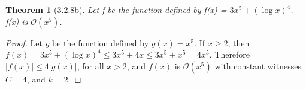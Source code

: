 \documentclass[a4paper, 12pt]{article}
\theoremstyle{plain}
\newtheorem*{theorem*}{Theorem}
\begin{document}
	
	\begin{theorem*}[3.2.8b]
		Let f be the function defined by f(x) = $3x^{5} + (\log x)^{4}$. \newline f(x) is $\mathcal{O}(x^{5})$.
	\end{theorem*}
	
	\begin{proof}
		Let $g$ be the function defined by $g(x) = x^{5}$. If $x \ge 2$, then
		\newline \newline \indent \indent
		$f(x) = 3x^{5} + (\log x)^{4} \le 3x^{5} + 4x \le 3x^{5} + x^{5} = 4x^{5}$. \newline \newline Therefore $|f(x)| \le 4|g(x)|$, for all $x > 2$, and $f(x)$ is $\mathcal{O}(x^{5})$ with constant witnesses $C = 4$, and $k = 2$.
	\end{proof}
\end{document}
